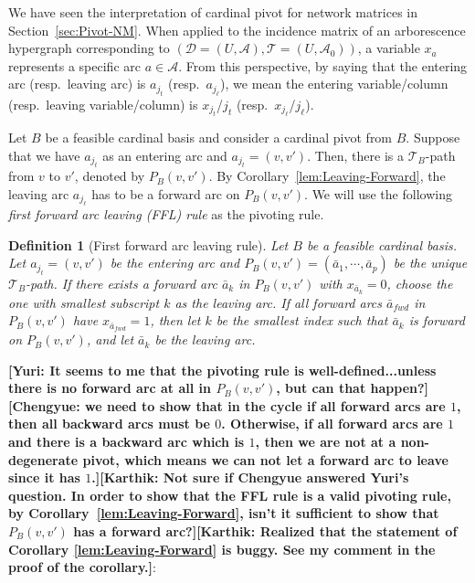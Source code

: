 \documentclass[11pt]{article}
\newcommand{\knote}[1]{{\bf{\color{blue}[\tiny Karthik: #1]}}}
\newcommand{\cnote}[1]{{\bf{\color{red}[\tiny Chengyue: #1]}}}
\newcommand{\ynote}[1]{{\bf{\color{orange}[\tiny Yuri: #1]}}}
\newtheorem{definition}[theorem]{Definition}
\begin{document}
We have seen the interpretation of cardinal pivot for network matrices in Section~\ref{sec:Pivot-NM}. When applied to the incidence matrix of an arborescence hypergraph corresponding to $(\mathcal{D}=(U,\mathcal{A}),\mathcal{T}=(U,\mathcal{A}_0))$, a variable $x_a$ represents a specific arc $a\in \mathcal{A}$. From this perspective, by saying that the entering arc (resp.~leaving arc) is $a_{j_t}$ (resp.~$a_{j_\ell}$), we mean the entering variable/column (resp.~leaving variable/column) is $x_{j_t}$/$j_t$ (resp.~$x_{j_\ell}$/$j_\ell$). 




Let $B$ be a feasible cardinal basis and consider a cardinal pivot from $B$. Suppose that we have $a_{j_t}$ as an entering arc and $a_{j_t}=(v,v')$. Then, there is a $\mathcal{T}_B$-path from $v$ to $v'$, denoted by $P_B(v,v')$. By Corollary~\ref{lem:Leaving-Forward}, the leaving arc $a_{j_\ell}$ has to be a forward arc on $P_B(v,v')$. We will use the following \emph{first forward arc leaving (FFL) rule} as the pivoting rule. 

\begin{definition}[First forward arc leaving rule]\label{def:First-Forward-Leaving}
Let $B$ be a feasible cardinal basis. Let $a_{j_t}=(v,v')$ be the entering arc and $P_B(v,v')=(\bar{a}_1,\cdots,\bar{a}_p)$ be the unique $\mathcal{T}_B$-path. If there exists a forward arc $\bar{a}_k$ in $P_B(v,v')$ with $x_{\bar{a}_k}=0$, choose the one with smallest subscript $k$ as the leaving arc. If all forward arcs $\bar{a}_{fwd}$ in $P_B(v,v')$ have $x_{\bar{a}_{fwd}}=1$, then let $k$ be the smallest index such that $\bar{a}_k$ is forward on $P_B(v,v')$, and let $\bar{a}_k$ be the leaving arc. \end{definition}

\iffalse
\ynote{It seems to me that the pivoting rule is well-defined...unless there is no forward arc at all in $P_B(v,v')$, but can that happen?}\cnote{we need to show that in the cycle if all forward arcs are $1$, then all backward arcs must be $0$. Otherwise, if all forward arcs are $1$ and there is a backward arc which is $1$, then we are not at a non-degenerate pivot, which means we can not let a forward arc to leave since it has $1$.}\knote{Not sure if Chengyue answered Yuri's question. In order to show that the FFL rule is a valid pivoting rule, by Corollary~\ref{lem:Leaving-Forward}, isn't it sufficient to show that $P_B(v,v')$ has a forward arc?}\knote{Realized that the statement of Corollary \ref{lem:Leaving-Forward} is buggy. See my comment in the proof of the corollary.}:
\end{document}
